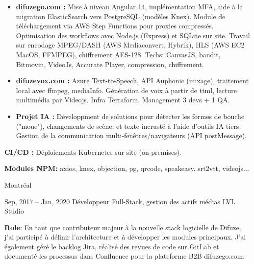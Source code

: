 \documentclass[
  a4paper,
   maincolor=cvblue,
   sectioncolor=cvblue,
   sidebarwidth=0.323\paperwidth,
]{fortysecondscv}
\begin{document}
\begin{cvtableNew}
{    \begin{itemize}[itemsep=-1mm, topsep=0pt, leftmargin=8pt]
      \item \textbf{difuzego.com :} Mise à niveau Angular 14, implémentation MFA, aide à la migration ElasticSearch vers PostgreSQL (modèles Knex). Module de téléchargement via AWS Step Functions pour proxies compressés. Optimisation des workflows avec Node.js (Express) et SQLite sur site. Travail sur encodage MPEG/DASH (AWS Mediaconvert, Hybrik), HLS (AWS EC2 MacOS, FFMPEG), chiffrement AES-128. Techs: CanvasJS, bandit, Bitmovin, VideoJs, Accurate Player, compression, chiffrement.\vspace{5pt}
      \item \textbf{difuzevox.com :} Azure Text-to-Speech, API Auphonic (mixage), traitement local avec ffmpeg, mediaInfo. Génération de voix à partir de ttml, lecture multimédia par Videojs. Infra Terraform. Management 3 devs + 1 QA.\vspace{5pt}
      \item \textbf{Projet IA :} Développment de solutions pour détecter les formes de bouche ("moue"), changements de scène, et texte incrusté à l'aide d'outils IA tiers. Gestion de la communication multi-fenêtres/navigateurs (API postMessage).\vspace{5pt}
    \end{itemize}

    \textbf{CI/CD :} Déploiements Kubernetes sur site (on-premises).\vspace{5pt}

    \textbf{Modules NPM:} axios, knex, objection, pg, qrcode, speakeasy, srt2vtt, videojs...
  }
  {Montréal} %

  \vspace{1.6mm}



  \cvitemRightNew
    {Sep, 2017 – Jan, 2020} %
    {Développeur Full-Stack, gestion des actifs médias} %
    {LVL Studio} %
      {
        \vspace{0.2pt} %
        \fontsize{10.8pt}{12pt}\selectfont %
        \textbf{Role}: En tant que contributeur majeur à la nouvelle stack logicielle de Difuze, j’ai participé à définir l’architecture et à développer les modules principaux. J’ai également géré le backlog Jira, réalisé des revues de code sur GitLab et documenté les processus dans Confluence pour la plateforme B2B difuzego.com.\vspace{5pt}

}
\end{cvtableNew}
\end{document}
